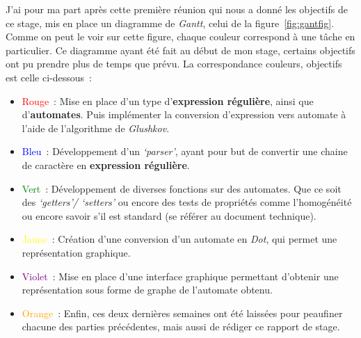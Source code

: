 \vphantom{}

J'ai pour ma part après cette première réunion qui nous a donné les objectifs
de ce stage, mis en place un diagramme de \textit{Gantt}, celui de la 
figure~\ref{fig:gantfig}. Comme on peut le voir sur cette figure, chaque couleur 
correspond à une tâche en particulier. Ce diagramme ayant été fait au début 
de mon stage, certains objectifs ont pu prendre plus de temps que prévu. La 
correspondance couleurs, objectifs est celle ci-dessous~:

\vphantom{}

\begin{itemize}
  \item[\textbullet] \textcolor{red}{Rouge}~: Mise en place d'un type 
  d'\textbf{expression régulière}, ainsi que d'\textbf{automates}. Puis 
  implémenter la conversion d'expression vers automate à l'aide de l'algorithme 
  de \textit{Glushkov}.
  \item[\textbullet] \textcolor{blue}{Bleu}~: Développement d'un 
  \textit{`parser'}, ayant pour but de convertir une chaine de caractère en 
  \textbf{expression régulière}.
  \item[\textbullet] \textcolor{green}{Vert}~: Développement de diverses 
  fonctions sur des automates. Que ce soit des \textit{`getters'/ `setters'} ou 
  encore des tests de propriétés comme l'homogénéité ou encore savoir s'il 
  est standard (se référer au document technique).
  \item[\textbullet] \textcolor{yellow}{Jaune}~: Création d'une conversion d'un
  automate en \textit{Dot}, qui permet une représentation graphique.
  \item[\textbullet] \textcolor{purple}{Violet}~: Mise en place d'une interface 
  graphique permettant d'obtenir une représentation sous forme de graphe de 
  l'automate obtenu.
  \item[\textbullet] \textcolor{orange}{Orange}~: Enfin, ces deux dernières 
  semaines ont été laissées pour peaufiner chacune des parties précédentes, mais 
  aussi de rédiger ce rapport de stage.
\end{itemize}

